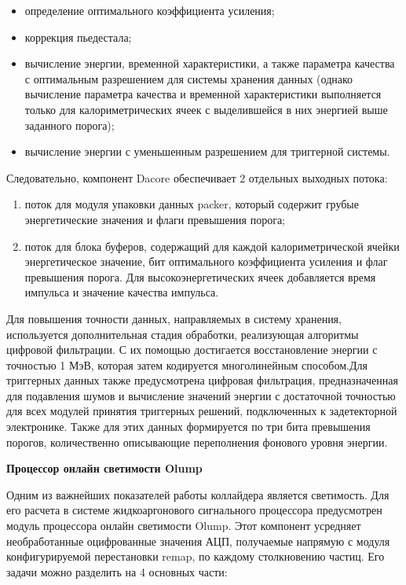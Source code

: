 \begin{itemize}
    \item определение оптимального коэффициента усиления;
    \item коррекция пьедестала;
    \item вычисление энергии, временной характеристики, а также параметра качества с оптимальным разрешением для системы хранения данных (однако вычисление параметра качества и временной характеристики выполняется только для калориметрических ячеек с выделившейся в них энергией выше заданного порога);
    \item вычисление энергии с уменьшенным разрешением для триггерной системы.
\end{itemize}\par
Следовательно, компонент Dacore обеспечивает 2 отдельных выходных потока:\par
\begin{enumerate}
    \item поток для модуля упаковки данных packer, который содержит грубые энергетические значения и флаги превышения порога;
    \item поток для блока буферов, содержащий для каждой калориметрической ячейки энергетическое значение, бит оптимального коэффициента усиления и флаг превышения порога. Для высокоэнергетических ячеек добавляется время импульса и значение качества импульса.
\end{enumerate}\par
Для повышения точности данных, направляемых в систему хранения, используется дополнительная стадия обработки, реализующая алгоритмы цифровой фильтрации. С их помощью достигается восстановление энергии с точностью 1 МэВ, которая затем кодируется многолинейным способом.Для триггерных данных также предусмотрена цифровая фильтрация, предназначенная для подавления шумов и вычисление значений энергии с достаточной точностью для всех модулей принятия триггерных решений, подключенных к задетекторной электронике. Также для этих данных формируется по три бита превышения порогов, количественно описывающие переполнения фонового уровня энергии.\par
\textbf{Процессор онлайн светимости Olump}\par
Одним из важнейших показателей работы коллайдера является светимость. Для его расчета в системе жидкоаргонового сигнального процессора предусмотрен модуль процессора онлайн светимости Olump. Этот компонент усредняет необработанные оцифрованные значения АЦП, получаемые напрямую с модуля конфигурируемой перестановки remap, по каждому столкновению частиц. Его задачи можно разделить на 4 основных части:\par
